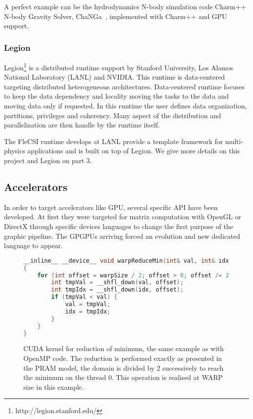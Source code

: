 A perfect example can be the hydrodynamics N-body simulation code Charm++ N-body Gravity Solver, ChaNGa~\cite{jetley2010scaling}, implemented with Charm++ and GPU support. 

\subsubsection{Legion}
Legion\footnote{http://legion.stanford.edu/} is a distributed runtime support by Stanford University, Los Alamos National Laboratory (LANL) and NVIDIA. 
This runtime is data-centered targeting distributed heterogeneous architectures. 
Data-centered runtime focuses to keep the data dependency and locality moving the tasks to the data and moving data only if requested. 
In this runtime the user defines data organization, partitions, privileges and coherency. 
Many aspect of the distribution and parallelization are then handle by the runtime itself.

The FleCSI runtime develops at LANL provide a template framework for multi-physics applications and is built on top of Legion. 
We give more details on this project and Legion on part 3.  

\subsection{Accelerators}
In order to target accelerators like GPU, several specific API have been developed. 
At first they were targeted for matrix computation with OpenGL or DirectX through specific devices languages to change the first purpose of the graphic pipeline. 
The GPGPUs arriving forced an evolution and new dedicated language to appear. 

\begin{figure}[t!]
\begin{lstlisting}[language=C]
__inline__ __device__ void warpReduceMin(int& val, int& idx)
{
    for (int offset = warpSize / 2; offset > 0; offset /= 2) {
        int tmpVal = __shfl_down(val, offset);
        int tmpIdx = __shfl_down(idx, offset);
        if (tmpVal < val) {
            val = tmpVal;
            idx = tmpIdx;
        }
    }
}
\end{lstlisting}
\caption[CUDA kernel for reduction]{CUDA kernel for reduction of minimum, the same example as with OpenMP code. The reduction is performed exactly as presented in the PRAM model, the domain is divided by 2 successively to reach the minimum on the thread 0. This operation is realised at WARP size in this example. }
\label{code:cuda_reduction}
\end{figure}

